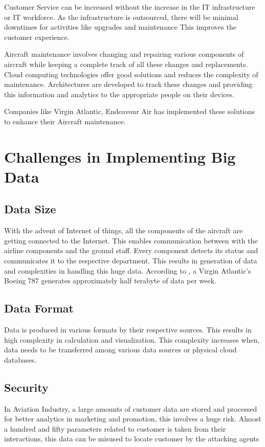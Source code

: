 \documentclass[sigconf]{acmart}
\begin{document}
Customer Service can be increased without the increase in the IT infrastructure or IT workforce. As the infrastructure is outsourced, there will be minimal downtimes for activities like upgrades and maintenance This improves the customer experience\cite{Ferkoun2015}.

Aircraft maintenance involves changing and repairing various components of aircraft while keeping a complete track of all these changes and replacements. Cloud computing technologies offer good solutions and reduces the complexity of maintenance\cite{Ferkoun2015}. Architectures are developed to track these changes and providing this information and analytics to the appropriate people on their devices. 

Companies like Virgin Atlantic, Endeavour Air has implemented these solutions to enhance their Aircraft maintenance\cite{Vault2014}.


 

\section{Challenges in Implementing Big Data}
 
 

\subsection{Data Size}
With the advent of Internet of things, all the components of the aircraft are getting connected to the Internet. This enables communication between with the airline components and the ground staff. Every component detects its status and communicates it to the respective department. This results in generation of data and complexities in handling this huge data. According to \cite{Finnegan2013}, a Virgin Atlantic’s Boeing 787 generates approximately half terabyte of data per week.

\subsection{Data Format}

Data is produced in various formats by their respective sources. This results in high complexity in calculation and visualization. This complexity increases when, data needs to be transferred among various data sources or physical cloud databases\cite{6548579}. 
\subsection{Security}
In Aviation Industry, a large amounts of customer data are stored and processed for better analytics in marketing and promotion, this involves a huge risk. Almost a hundred and fifty parameters related to customer is taken from their interactions\cite{EXASTAX2017}, this data can be misused to locate customer by the attacking agents
\end{document}
